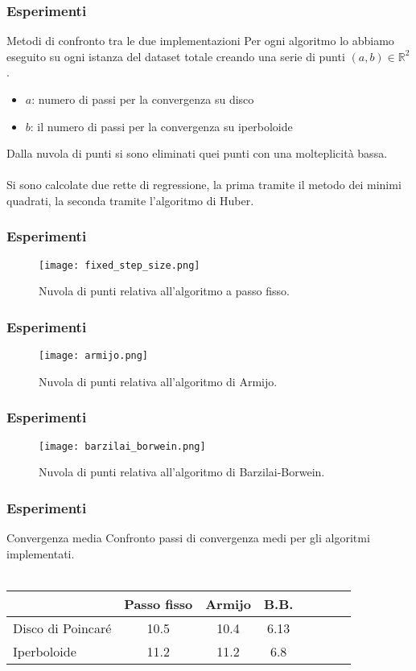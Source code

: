 \documentclass{beamer}
\begin{document}
\begin{frame}
\frametitle{Esperimenti}
\begin{beamerboxesrounded}{Metodi di confronto tra le due implementazioni}
Per ogni algoritmo lo abbiamo eseguito su ogni istanza del dataset totale creando una serie di punti $(a, b) \in \mathbb{R}^2$.\\
\begin{itemize}
    \item $a$: numero di passi per la convergenza su disco
    \item $b$: il numero di passi per la convergenza su iperboloide
\end{itemize}
\bigskip
Dalla nuvola di punti si sono eliminati quei punti con una molteplicità bassa.\\\\
Si sono calcolate due rette di regressione, la prima tramite il metodo dei \alert{minimi quadrati}, la seconda tramite l’algoritmo di \alert{Huber}.
\end{beamerboxesrounded}
\end{frame}

\begin{frame}
\frametitle{Esperimenti}
\begin{figure}[H]
    \texttt{[image: fixed\_step\_size.png]}
    \caption{Nuvola di punti relativa all’algoritmo a passo fisso.}
\end{figure}
\end{frame}

\begin{frame}
\frametitle{Esperimenti}
\begin{figure}[H]
    \texttt{[image: armijo.png]}
    \caption{Nuvola di punti relativa all’algoritmo di Armijo.}
\end{figure}
\end{frame}

\begin{frame}
\frametitle{Esperimenti}
\begin{figure}[H]
    \texttt{[image: barzilai\_borwein.png]}
    \caption{Nuvola di punti relativa all’algoritmo di Barzilai-Borwein.}
\end{figure}
\end{frame}

\begin{frame}
\frametitle{Esperimenti}
\begin{beamerboxesrounded}{Convergenza media}
Confronto passi di convergenza medi per gli algoritmi implementati.\\~\
\begin{center}
\begin{tabular}{l*{6}{c}r}
                    & Passo fisso & Armijo & B.B. \\
\hline
Disco di Poincaré   & 10.5 & 10.4 & 6.13 \\
Iperboloide         & 11.2 & 11.2 & 6.8 \\
\end{tabular}
\end{center}
\end{beamerboxesrounded}
\end{frame}
\end{document}
